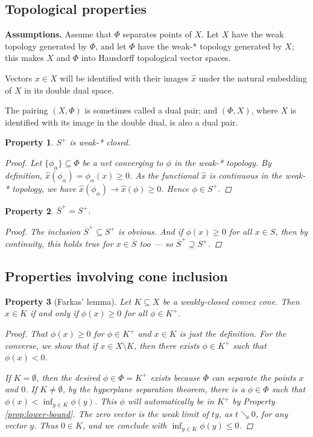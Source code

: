 \documentclass[12pt]{article}
\newtheorem{prop}{Property}
\begin{document}
\subsection*{Topological properties}

\textbf{Assumptions.}
Assume that $\Phi$ separates points of $X$.
Let $X$ have the weak topology generated by $\Phi$,
and let $\Phi$ have the weak-* topology generated by $X$;
this makes $X$ and $\Phi$ into Hausdorff topological vector spaces.

Vectors $x \in X$ will be identified
with their images $\hat{x}$ under the natural embedding of $X$
 in its double dual space.

The pairing $(X, \Phi)$ is sometimes called a dual pair; 
and $(\Phi, X)$, where $X$ is identified with its image in the double dual,
is also a dual pair.

\begin{prop}\label{prop:closed}
$S^+$ is weak-* closed.
\begin{proof}
Let $\{ \phi_\alpha \} \subseteq \Phi$ be a net converging to $\phi$
in the weak-* topology.
By definition, $\hat{x}(\phi_\alpha) = \phi_\alpha(x) \geq 0$.  
As the functional $\hat{x}$ is continuous in the weak-* topology,
we have $\hat{x}(\phi_\alpha) \to \hat{x}(\phi) \geq 0$.
Hence $\phi \in S^+$.
\end{proof}
\end{prop}

\begin{prop}\label{prop:closure}
$\overline{S}^+ = S^+$.
\begin{proof}
The inclusion $\overline{S}^+ \subseteq S^+$ is obvious.
And if $\phi(x) \geq 0$ for all $x \in S$,
then by continuity, this holds true for $x \in \overline{S}$ too ---
so $\overline{S}^+ \supseteq S^+$.
\end{proof}
\end{prop}

\subsection*{Properties involving cone inclusion}

\begin{prop}[Farkas' lemma]\label{prop:test}
Let $K \subseteq X$ be a weakly-closed convex cone.
Then $x \in K$ if and only if $\phi(x) \geq 0$ for all $\phi \in K^+$.
\begin{proof}
That $\phi(x) \geq 0$ for $\phi \in K^+$ and $x \in K$ is just the definition.
For the converse, we show that if $x \in X \setminus K$,
then there exists $\phi \in K^+$ such that $\phi(x) < 0$.

If $K=\emptyset$, then the desired $\phi \in \Phi = K^+$
exists because $\Phi$ can separate the points $x$ and $0$.
If $K \neq \emptyset$, by the hyperplane separation theorem,
there is a $\phi \in \Phi$ such that $\phi(x) < \inf_{y \in K} \phi(y)$.
This $\phi$ will automatically be in $K^+$ by Property \ref{prop:lower-bound}.
The zero vector is the weak limit of $ty$, as $t \searrow 0$,
for any vector $y$.
Thus $0 \in K$, and 
we conclude with $\inf_{y \in K} \phi(y) \leq 0$.
\end{proof}
\end{prop}
\end{document}
